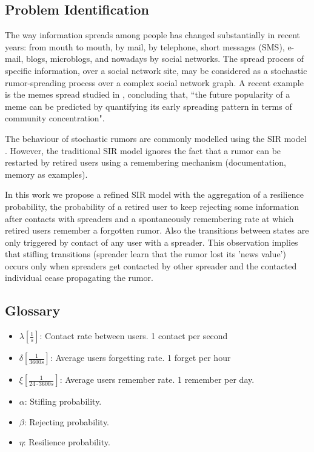 \subsection{Problem Identification}

The way information spreads among people has changed substantially in recent years: from mouth to mouth, by mail, by telephone, short messages (SMS), e-mail,
blogs, microblogs, and nowadays by social networks. 
The spread process of specific information, over a social network site, may be considered as a stochastic rumor-spreading process over a complex social network graph. 
A recent example is the memes spread studied in \cite{weng2013virality}, concluding that, ``the future popularity of a meme can be predicted by quantifying its early spreading pattern in terms of community concentration".

The behaviour of stochastic rumors are commonly modelled using the SIR model \cite{nekovee2007theory}. However, the traditional SIR model ignores the fact that a rumor can be restarted by retired users using a remembering mechanism (documentation, memory as examples).

In this work we propose a refined SIR model with the aggregation of a resilience probability, the probability of a retired user to keep rejecting some information after contacts with spreaders and a spontaneously remembering rate at which retired users remember a forgotten rumor. 
Also the transitions between states are only triggered by contact of any user with a spreader. This observation implies that stifling transitions (spreader learn that the rumor lost its 'news value') occurs only when spreaders get contacted by other spreader and the contacted individual cease propagating the rumor.

\subsection{Glossary}

\begin{itemize}
	\item$\lambda[\frac{1}{s}]$: Contact rate between users. 1 contact per second 
	\item$\delta[\frac{1}{3600s}]$: Average users forgetting rate. 1 forget per hour 
	\item$\xi[\frac{1}{24\cdot3600s}]$: Average users remember rate. 1 remember per day.
\end{itemize}
\begin{itemize}
	\item$\alpha$: Stifling probability.  
	\item$\beta$: Rejecting probability.
	\item$\eta$: Resilience probability.
\end{itemize}


